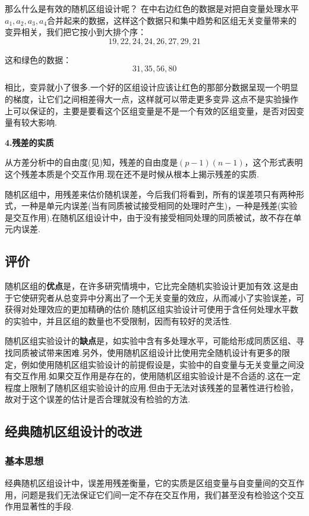 那么什么是有效的随机区组设计呢？
在中右边红色的数据是对把自变量处理水平$a_1,a_2,a_3,a_4$合并起来的数据，这样这个数据只和集中趋势和区组无关变量带来的变异相关，我们把它按小到大排个序：
\[ 19,22,24,24,26,27,29,21 \]

这和绿色的数据：
\[ 31,35,56,80 \]

相比，变异就小了很多.一个好的区组设计应该让红色的那部分数据呈现一个明显的梯度，让它们之间相差得大一点，这样就可以带走更多变异.这点不是实验操作上可以保证的，主要是要看这个区组变量是不是一个有效的区组变量，是否对因变量有较大影响.

\textbf{4.残差的实质}

从方差分析中的自由度(见)知，残差的自由度是$(p-1)(n-1)$，这个形式表明这个残差本质是个交互作用.现在还不是时候从根本上揭示残差的实质.

随机区组中，用残差来估价随机误差，今后我们将看到，所有的误差项只有两种形式，一种是单元内误差(当有同质被试接受相同的处理时产生)，一种是残差(实验是交互作用).在随机区组设计中，由于没有接受相同处理的同质被试，故不存在单元内误差.

\subsection{评价}
随机区组的\textbf{优点}是，在许多研究情境中，它比完全随机实验设计更加有效.这是由于它使研究者从总变异中分离出了一个无关变量的效应，从而减小了实验误差，可获得对处理效应的更加精确的估价.随机区组实验设计可使用于含任何处理水平数的实验中，并且区组的数量也不受限制，因而有较好的灵活性.

随机区组实验设计的\textbf{缺点}是，如实验中含有多处理水平，可能给形成同质区组、寻找同质被试带来困难.另外，使用随机区组设计比使用完全随机设计有更多的限定，例如使用随机区组实验设计的前提假设是，实验中的自变量与无关变量之间没有交互作用.如果交互作用是存在的，使用随机区组实验设计是不合适的.这在一定程度上限制了随机区组实验设计的应用.但由于无法对该残差的显著性进行检验，故对于这个误差的估计是否合理就没有检验的方法.

\subsection{经典随机区组设计的改进}
\subsubsection{基本思想}
经典随机区组设计中，误差用残差衡量，它的实质是区组变量与自变量间的交互作用，问题是我们无法保证它们间一定不存在交互作用，我们甚至没有检验这个交互作用显著性的手段.

